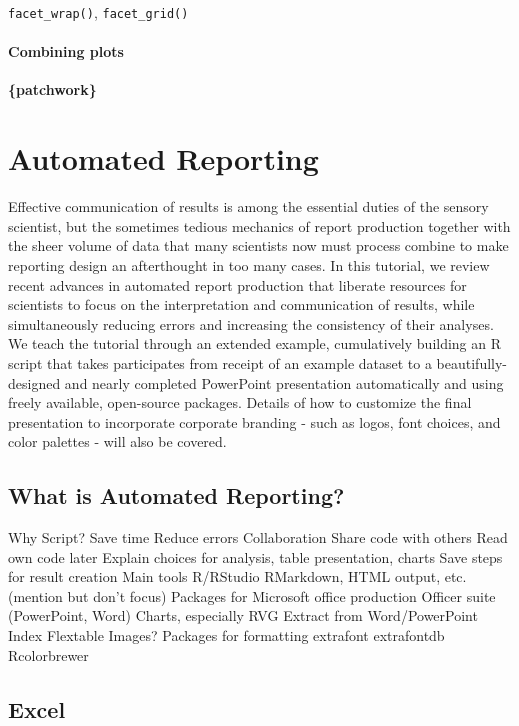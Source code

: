 \documentclass[
]{book}
\begin{document}
\texttt{facet\_wrap()}, \texttt{facet\_grid()}

\hypertarget{combining-plots}{%
\subsubsection{Combining plots}\label{combining-plots}}

\textbf{\{patchwork\}}

\hypertarget{auto-report}{%
\chapter{Automated Reporting}\label{auto-report}}

Effective communication of results is among the essential duties of the sensory scientist, but the sometimes tedious mechanics of report production together with the sheer volume of data that many scientists now must process combine to make reporting design an afterthought in too many cases. In this tutorial, we review recent advances in automated report production that liberate resources for scientists to focus on the interpretation and communication of results, while simultaneously reducing errors and increasing the consistency of their analyses. We teach the tutorial through an extended example, cumulatively building an R script that takes participates from receipt of an example dataset to a beautifully-designed and nearly completed PowerPoint presentation automatically and using freely available, open-source packages. Details of how to customize the final presentation to incorporate corporate branding - such as logos, font choices, and color palettes - will also be covered.

\hypertarget{what-is-automated-reporting}{%
\section{What is Automated Reporting?}\label{what-is-automated-reporting}}

Why Script?
Save time
Reduce errors
Collaboration
Share code with others
Read own code later
Explain choices for analysis, table presentation, charts
Save steps for result creation
Main tools
R/RStudio
RMarkdown, HTML output, etc. (mention but don't focus)
Packages for Microsoft office production
Officer suite (PowerPoint, Word)
Charts, especially RVG
Extract from Word/PowerPoint
Index
Flextable
Images?
Packages for formatting
extrafont
extrafontdb
Rcolorbrewer

\hypertarget{excel}{%
\section{Excel}\label{excel}}
\end{document}
